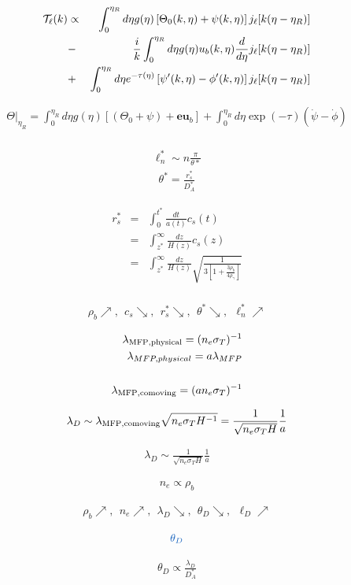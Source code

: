 \documentclass[a4paper, 11pt]{article}
\def\ba{\begin{eqnarray}}
\def\ea{\end{eqnarray}}
\newcommand{\blue}[1]{{\color{denim}#1}}
\begin{document}
 
 \ba
 {\cal T}_{\ell}(k)&\propto& \int_{0}^{\eta_{R}} d\eta g(\eta) \left[ \Theta_{0}(k,\eta) + \psi(k,\eta) \right]  j_{\ell}[k(\eta-\eta_{R})] \\
   &- & \frac{i}{k} \int_{0}^{\eta_{R}} d\eta    g(\eta) u_{b} (k,\eta)    \frac{d}{d\eta}  j_{\ell}[k(\eta-\eta_{R})]   \\
   &+&  \int_{0}^{\eta_{R}} d\eta e^{- \tau(\eta)} \left[\psi'(k,\eta) - \phi'(k,\eta)   \right]  j_{\ell}[k(\eta-\eta_{R})]  \\
         \ea


\ba
\Theta  |_{\eta_{R}} = \int_{0}^{\eta_{R}} d\eta g(\eta) \left[\left(\Theta_{0}+ \psi \right)  + \bm{e}{\bm u_{b}}  \right] + \int_{0}^{\eta_{R}} d\eta \exp(-\tau)  (\dot{\psi} - \dot{\phi})   \\
\ea

\ba
\ell^{*}_{n} \sim n \frac{\pi}{\theta{*}}
\ea
\ba
\theta^{*} = \frac{r^{*}_{s}}{D_{A}^{*}}
\ea

\ba
r^{*}_{s} &=& \int_{0}^{t^{*}} \frac{dt}{a(t)} c_{s}(t) \\
 	     &=& \int_{z^{*}}^{\infty} \frac{dz}{H(z)} c_{s}(z) \\
	     &=& \int_{z^{*}}^{\infty} \frac{dz}{H(z)} \sqrt{\frac{1}{3\left[1+ \frac{3\rho_{b}}{4\rho_{\gamma}} \right]}} \\
\ea

\ba
\rho_{b} \nearrow, \ \ c_{s} \searrow, \ \  r^{*}_{s} \searrow, \ \  \theta^{*} \searrow,  \ \  \ell^{*}_{n}  \nearrow
\ea

\ba
\lambda_{\rm MFP, physical} = (n_{e} \sigma_{T})^{-1} \\
\lambda_{MFP, physical} =  a \lambda_{MFP}  \\\\
\lambda_{\rm MFP, comoving} = (a n_{e} \sigma_{T})^{-1}
\ea


\ba
\lambda_{D} \sim \lambda_{\rm MFP, comoving} \sqrt{n_{e} \sigma_{T} H^{-1}}= \frac{1}{\sqrt{n_{e} \sigma_{T} H}}\frac{1}{a}
\ea

\ba
\lambda_{D} \sim  \frac{1}{\sqrt{n_{e} \sigma_{T} H}}\frac{1}{a}
\ea

\ba
n_{e} \propto \rho_{b}
\ea

\ba
\rho_{b} \nearrow , \ \ n_{e} \nearrow, \ \ \lambda_{D} \searrow, \ \ \theta_{D} \searrow, \ \  \ell_{D}  \nearrow
\ea

\ba
\blue{\theta_{D}}
\ea

\ba
\theta_{D} \propto \frac{\lambda_{D}}{D_{A}^{*}}
\ea
\end{document}
